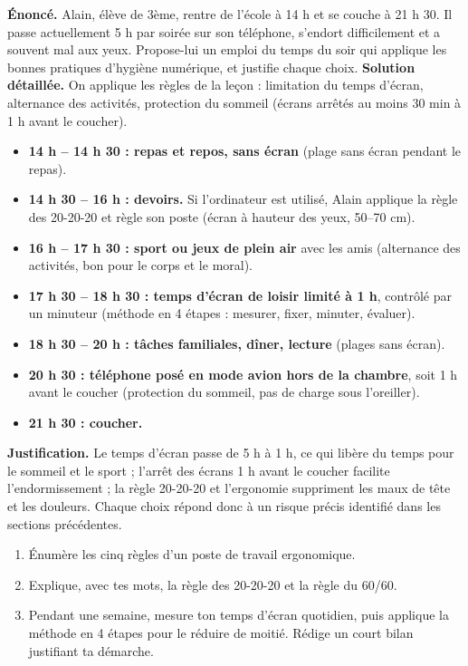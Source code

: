 \documentclass[11pt]{article}
\begin{document}
\begin{exoresolu}
\textbf{Énoncé.} Alain, élève de 3ème, rentre de l'école à 14 h et se couche à 21 h 30. Il passe actuellement 5 h par soirée sur son téléphone, s'endort difficilement et a souvent mal aux yeux. Propose-lui un emploi du temps du soir qui applique les bonnes pratiques d'hygiène numérique, et justifie chaque choix.
\tcblower
\textbf{Solution détaillée.} On applique les règles de la leçon : limitation du temps d'écran, alternance des activités, protection du sommeil (écrans arrêtés au moins 30 min à 1 h avant le coucher).
\begin{itemize}
  \item \textbf{14 h -- 14 h 30 : repas et repos, sans écran} (plage sans écran pendant le repas).
  \item \textbf{14 h 30 -- 16 h : devoirs.} Si l'ordinateur est utilisé, Alain applique la règle des 20-20-20 et règle son poste (écran à hauteur des yeux, 50--70 cm).
  \item \textbf{16 h -- 17 h 30 : sport ou jeux de plein air} avec les amis (alternance des activités, bon pour le corps et le moral).
  \item \textbf{17 h 30 -- 18 h 30 : temps d'écran de loisir limité à 1 h}, contrôlé par un minuteur (méthode en 4 étapes : mesurer, fixer, minuter, évaluer).
  \item \textbf{18 h 30 -- 20 h : tâches familiales, dîner, lecture} (plages sans écran).
  \item \textbf{20 h 30 : téléphone posé en mode avion hors de la chambre}, soit 1 h avant le coucher (protection du sommeil, pas de charge sous l'oreiller).
  \item \textbf{21 h 30 : coucher.}
\end{itemize}
\textbf{Justification.} Le temps d'écran passe de 5 h à 1 h, ce qui libère du temps pour le sommeil et le sport ; l'arrêt des écrans 1 h avant le coucher facilite l'endormissement ; la règle 20-20-20 et l'ergonomie suppriment les maux de tête et les douleurs. Chaque choix répond donc à un risque précis identifié dans les sections précédentes.
\end{exoresolu}

\begin{exercice}
\begin{enumerate}
  \item Énumère les cinq règles d'un poste de travail ergonomique.
  \item Explique, avec tes mots, la règle des 20-20-20 et la règle du 60/60.
  \item Pendant une semaine, mesure ton temps d'écran quotidien, puis applique la méthode en 4 étapes pour le réduire de moitié. Rédige un court bilan justifiant ta démarche.
\end{enumerate}
\end{exercice}
\end{document}
